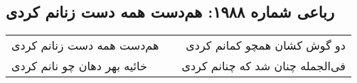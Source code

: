 \begin{center}
\section*{رباعی شماره ۱۹۸۸: هم‌دست همه دست زنانم کردی}
\label{sec:1988}
\begin{longtable}{l p{0.5cm} r}
هم‌دست همه دست زنانم کردی
&&
دو گوش کشان همچو کمانم کردی
\\
خائیه بهر دهان چو نانم کردی
&&
فی‌الجمله چنان شد که چنانم کردی
\\
\end{longtable}
\end{center}
